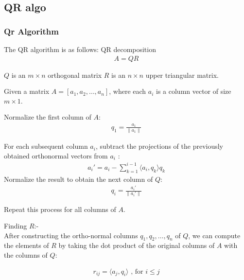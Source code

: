 \documentclass{beamer}
\theoremstyle{remark}
\providecommand{\norm}[1]{\lVert#1\rVert}
\numberwithin{equation}{section}
\begin{document}
\subsection{QR algo}
\begin{frame}
    \frametitle{Qr Algorithm}
    The QR algorithm is as follows:
 QR decomposition 
\begin{align}
A = QR
\end{align}

     $Q$ is an $ m \times n $ orthogonal matrix
     $R$ is an $n \times n$ upper triangular matrix.

Given a matrix $ A = [a_1, a_2, \dots, a_n] $, where each $ a_i $ is a column vector of size $ m \times 1 $.

 Normalize the first column of $A$:
\begin{align}
q_1 = \frac{a_1}{\norm{a_1}}
\end{align}
\end{frame}
\begin{frame}
  For each subsequent column $ a_i $, subtract the projections of the previously obtained orthonormal vectors from $ a_i $ :
\begin{align}
a_i' = a_i - \sum_{k=1}^{i-1} \langle a_i, q_k \rangle q_k
\end{align}
Normalize the result to obtain the next column of \( Q \):
\begin{align}
q_i = \frac{a_i'}{\norm{a_i'}}
\end{align}

Repeat this process for all columns of \( A \).

 Finding $R$:- \\
After constructing the ortho-normal columns $ q_1, q_2, \dots, q_n $ of $Q$, we can compute the elements of $R$ by taking the dot product of the original columns of $A$ with the columns of $Q$:

\begin{align}
    r_{ij} = \langle a_j, q_i \rangle \text{ , for  }  i \leq j 
\end{align}

\end{frame}

\end{document}
